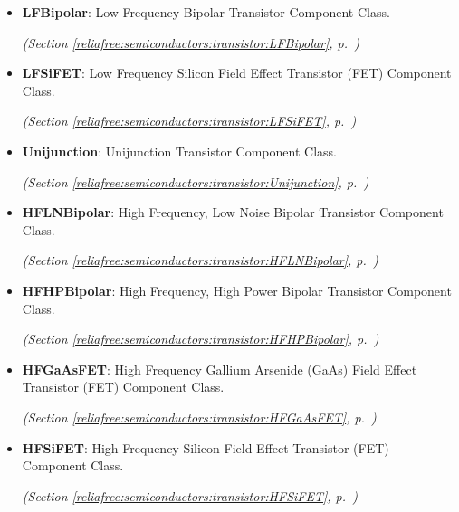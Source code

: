 \begin{itemize}  \setlength{\parskip}{0ex}
  \item \textbf{LFBipolar}: Low Frequency Bipolar Transistor Component Class.



  \textit{(Section \ref{reliafree:semiconductors:transistor:LFBipolar}, p.~\pageref{reliafree:semiconductors:transistor:LFBipolar})}

  \item \textbf{LFSiFET}: Low Frequency Silicon Field Effect Transistor (FET) Component Class.



  \textit{(Section \ref{reliafree:semiconductors:transistor:LFSiFET}, p.~\pageref{reliafree:semiconductors:transistor:LFSiFET})}

  \item \textbf{Unijunction}: Unijunction Transistor Component Class.



  \textit{(Section \ref{reliafree:semiconductors:transistor:Unijunction}, p.~\pageref{reliafree:semiconductors:transistor:Unijunction})}

  \item \textbf{HFLNBipolar}: High Frequency, Low Noise Bipolar Transistor Component Class.



  \textit{(Section \ref{reliafree:semiconductors:transistor:HFLNBipolar}, p.~\pageref{reliafree:semiconductors:transistor:HFLNBipolar})}

  \item \textbf{HFHPBipolar}: High Frequency, High Power Bipolar Transistor Component Class.



  \textit{(Section \ref{reliafree:semiconductors:transistor:HFHPBipolar}, p.~\pageref{reliafree:semiconductors:transistor:HFHPBipolar})}

  \item \textbf{HFGaAsFET}: High Frequency Gallium Arsenide (GaAs) Field Effect Transistor (FET) 
Component Class.



  \textit{(Section \ref{reliafree:semiconductors:transistor:HFGaAsFET}, p.~\pageref{reliafree:semiconductors:transistor:HFGaAsFET})}

  \item \textbf{HFSiFET}: High Frequency Silicon Field Effect Transistor (FET) Component Class.



  \textit{(Section \ref{reliafree:semiconductors:transistor:HFSiFET}, p.~\pageref{reliafree:semiconductors:transistor:HFSiFET})}

\end{itemize}


